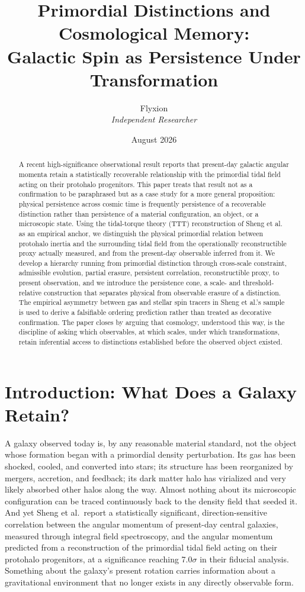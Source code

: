 \documentclass[11pt]{article}
\title{Primordial Distinctions and Cosmological Memory:\\
Galactic Spin as Persistence Under Transformation}
\author{Flyxion\\ \textit{Independent Researcher}}
\date{August 2026}
\begin{document}
\maketitle

\begin{abstract}
\noindent A recent high-significance observational result reports that present-day galactic angular momenta retain a statistically recoverable relationship with the primordial tidal field acting on their protohalo progenitors. This paper treats that result not as a confirmation to be paraphrased but as a case study for a more general proposition: physical persistence across cosmic time is frequently persistence of a recoverable distinction rather than persistence of a material configuration, an object, or a microscopic state. Using the tidal-torque theory (TTT) reconstruction of Sheng et al. as an empirical anchor, we distinguish the physical primordial relation between protohalo inertia and the surrounding tidal field from the operationally reconstructible proxy actually measured, and from the present-day observable inferred from it. We develop a hierarchy running from primordial distinction through cross-scale constraint, admissible evolution, partial erasure, persistent correlation, reconstructible proxy, to present observation, and we introduce the persistence cone, a scale- and threshold-relative construction that separates physical from observable erasure of a distinction. The empirical asymmetry between gas and stellar spin tracers in Sheng et al.'s sample is used to derive a falsifiable ordering prediction rather than treated as decorative confirmation. The paper closes by arguing that cosmology, understood this way, is the discipline of asking which observables, at which scales, under which transformations, retain inferential access to distinctions established before the observed object existed.
\end{abstract}

\section{Introduction: What Does a Galaxy Retain?}

A galaxy observed today is, by any reasonable material standard, not the object whose formation began with a primordial density perturbation. Its gas has been shocked, cooled, and converted into stars; its structure has been reorganized by mergers, accretion, and feedback; its dark matter halo has virialized and very likely absorbed other halos along the way. Almost nothing about its microscopic configuration can be traced continuously back to the density field that seeded it. And yet Sheng et al.\ report a statistically significant, direction-sensitive correlation between the angular momentum of present-day central galaxies, measured through integral field spectroscopy, and the angular momentum predicted from a reconstruction of the primordial tidal field acting on their protohalo progenitors, at a significance reaching 7.0$\sigma$ in their fiducial analysis. Something about the galaxy's present rotation carries information about a gravitational environment that no longer exists in any directly observable form.
\end{document}
